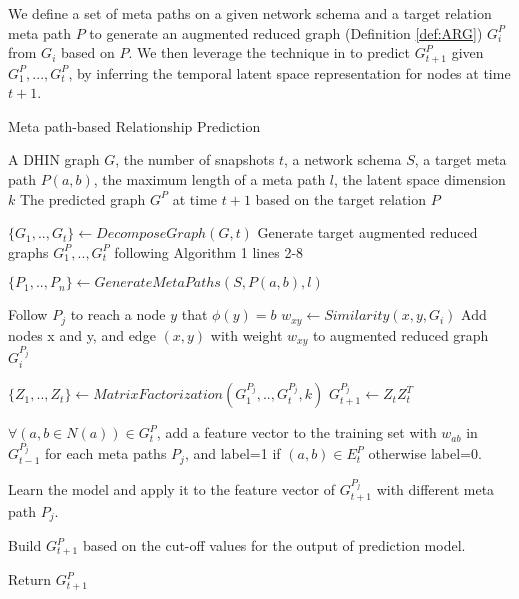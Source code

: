 We define a set of meta paths \cite{sun2011pathsim} on a given network schema and a target relation meta path $P$ to generate an augmented reduced graph (Definition \ref{def:ARG}) $G^P_i$ from $G_i$ based on $P$.  We then leverage the technique in \cite{Zhu2016} to predict $G^P_{t+1}$ given $G^P_1, ..., G^P_t$, by inferring the temporal latent space representation for nodes at time $t+1$.


\begin{algorithm}[t]
\caption{Meta path-based Relationship Prediction}\label{alg2}
\begin{algorithmic}[1]\scriptsize
\REQUIRE A DHIN graph $G$, the number of snapshots $t$, a network schema $S$, a target meta path $P(a,b)$, the maximum length of a meta path $l$, the latent space dimension $k$
\ENSURE The predicted graph $G^{P}$ at time $t+1$ based on the target relation $P$

\STATE $\{G_1, .., G_t\} \leftarrow DecomposeGraph(G, t)$
\STATE  Generate target augmented reduced graphs $G^P_1, .., G^P_t$ following Algorithm 1 lines 2-8

\STATE $\{P_1, .., P_n\} \leftarrow GenerateMetaPaths(S, P(a,b), l)$



        \STATE Follow $P_j$ to reach a node $y$ that $\phi(y)=b$%
        \STATE $w_{xy} \leftarrow Similarity(x,y, G_i)$
        \STATE Add nodes x and y, and edge $(x,y)$ with weight $w_{xy}$ to augmented reduced graph $G_i^{P_j}$ 
\ENDFOR

\ENDFOR

\STATE $\{Z_1, .., Z_t\} \leftarrow MatrixFactorization(G^{P_j}_1, .., G^{P_j}_t, k)$
\STATE $G^{P_j}_{t+1} \leftarrow Z_tZ^T_t$ 

\ENDFOR


\STATE $\forall (a,b\in N(a)) \in G^{P}_{t}$, add a feature vector to the training set with $w_{ab}$ in $G^{P_j}_{t-1}$ for each meta paths $P_j$, and label=1 if $(a,b) \in E^{P}_{t}$ otherwise label=0.

\STATE Learn the model and apply it to the feature vector of $G^{P_j}_{t+1}$ with different meta path $P_j$.

\STATE Build $G^{P}_{t+1}$ based on the cut-off values for the output of prediction model.

\STATE Return $G^{P}_{t+1}$
\end{algorithmic}
\end{algorithm}

